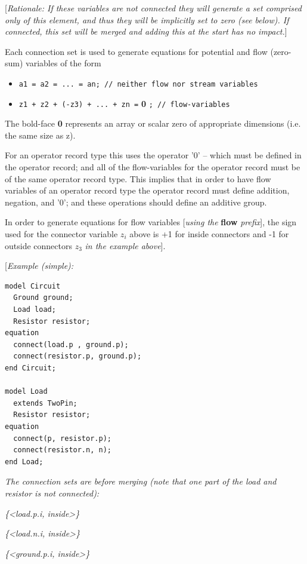 \documentclass[10pt,a4paper]{report}
\begin{document}
{[}\emph{Rationale: If these variables are not connected they will
generate a set comprised only of this element, and thus they will be
implicitly set to zero (see below). If connected, this set will be
merged and adding this at the start has no impact.}{]}

Each connection set is used to generate equations for potential and flow
(zero-sum) variables of the form

\begin{itemize}
\item
\lstinline!a1 = a2 = ... = an; // neither flow nor stream variables!
\item
\lstinline!z1 + z2 + (-z3) + ... + zn =! \textbf{0} \lstinline!; // flow-variables!
\end{itemize}

The bold-face \textbf{0} represents an array or scalar zero of
appropriate dimensions (i.e. the same size as z).

For an operator record type this uses the operator '0' -- which must be
defined in the operator record; and all of the flow-variables for the
operator record must be of the same operator record type. This implies
that in order to have flow variables of an operator record type the
operator record must define addition, negation, and '0'; and these
operations should define an additive group.

In order to generate equations for flow variables {[}\emph{using the}
\textbf{flow} \emph{prefix}{]}, the sign used for the connector variable
$z_i$ above is +1 for inside connectors and -1 for outside
connectors $z_3$ \emph{in the example above}{]}.

{[}\emph{Example (simple):}

\begin{lstlisting}[language=modelica]
model Circuit
  Ground ground;
  Load load;
  Resistor resistor;
equation
  connect(load.p , ground.p);
  connect(resistor.p, ground.p);
end Circuit;

model Load
  extends TwoPin;
  Resistor resistor;
equation
  connect(p, resistor.p);
  connect(resistor.n, n);
end Load;
\end{lstlisting}
\emph{The connection sets are before merging (note that one part of the
load and resistor is not connected):}

\emph{\{\textless{}load.p.i, inside\textgreater{}\}}

\emph{\{\textless{}load.n.i, inside\textgreater{}\}}

\emph{\{\textless{}ground.p.i, inside\textgreater{}\}}
\end{document}
